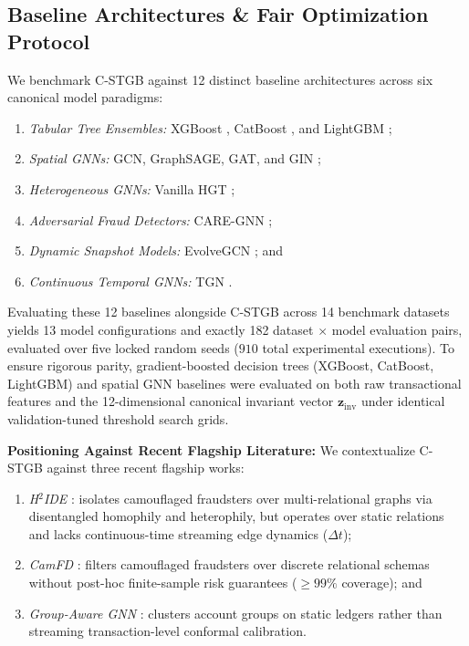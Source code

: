 \subsection{Baseline Architectures \& Fair Optimization Protocol}
\label{sec:baselines_protocol}
We benchmark C-STGB against 12 distinct baseline architectures across six canonical model paradigms:
\begin{enumerate}
    \item \textit{Tabular Tree Ensembles:} XGBoost \citep{chen2016xgboost}, CatBoost \citep{prokhorenkova2018catboost}, and LightGBM \citep{ke2017lightgbm};
    \item \textit{Spatial GNNs:} GCN, Graph\-SAGE, GAT, and GIN \citep{kipf2017semi, hamilton2017inductive, velickovic2018graph, xu2019powerful};
    \item \textit{Heterogeneous GNNs:} Vanilla HGT \citep{hu2020heterogeneous};
    \item \textit{Adversarial Fraud Detectors:} CARE-GNN \citep{dou2020enhancing};
    \item \textit{Dynamic Snapshot Models:} EvolveGCN \citep{pareja2020evolvegcn}; and
    \item \textit{Continuous Temporal GNNs:} TGN \citep{rossi2020temporal}.
\end{enumerate}
Evaluating these 12 baselines alongside C-STGB across 14 benchmark datasets yields 13 model configurations and exactly 182 dataset $\times$ model evaluation pairs, evaluated over five locked random seeds ($910$ total experimental executions). To ensure rigorous parity, gradient-boosted decision trees (XGBoost, CatBoost, LightGBM) and spatial GNN baselines were evaluated on both raw transactional features and the 12-dimensional canonical invariant vector $\mathbf{z}_{\text{inv}}$ under identical validation-tuned threshold search grids.

\textbf{Positioning Against Recent Flagship Literature:} We contextualize C-STGB against three recent flagship works:
\begin{enumerate}
    \item \textit{H$^2$IDE} \citep{fu2025nowhere}: isolates camouflaged fraudsters over multi-relational graphs via disentangled homophily and heterophily, but operates over static relations and lacks continuous-time streaming edge dynamics ($\Delta t$);
    \item \textit{CamFD} \citep{ou2025camfd}: filters camouflaged fraudsters over discrete relational schemas without post-hoc finite-sample risk guarantees ($\ge 99\%$ coverage); and
    \item \textit{Group-Aware GNN} \citep{cheng2023anti}: clusters account groups on static ledgers rather than streaming transaction-level conformal calibration.
\end{enumerate}

